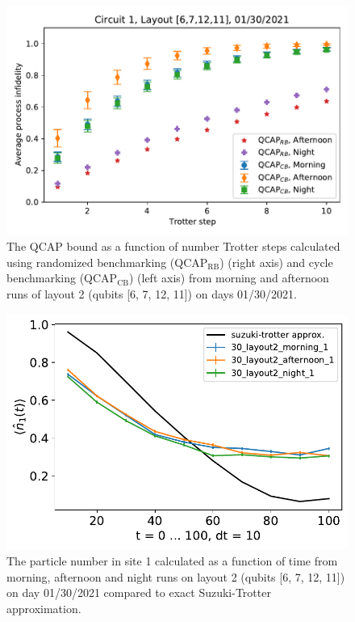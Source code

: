 \begin{figure}[htpb]
    \includegraphics[scale=0.56]{QCAP_CB_RB_Data_01_30_2021_Layout_2C1.pdf}
    \caption{The QCAP bound as a function of number Trotter steps calculated using randomized benchmarking (QCAP$_{\text{RB}}$) (right axis) and cycle benchmarking (QCAP$_{\text{CB}}$) (left axis) from morning and afternoon runs of layout 2 (qubits [6, 7, 12, 11]) on days 01/30/2021.}
    \label{fig:QCAPCB_RB_Story7}
\end{figure}

\begin{figure}[htpb]
    \includegraphics[scale=0.55]{TIM_[30]_[layout2]_[morning, afternoon, night]_n1.pdf}
    \caption{The particle number in site 1 calculated as a function of time from morning, afternoon and night runs on layout 2 (qubits [6, 7, 12, 11]) on day 01/30/2021 compared to exact Suzuki-Trotter approximation.}
    \label{fig:n1_Story7}
\end{figure}

